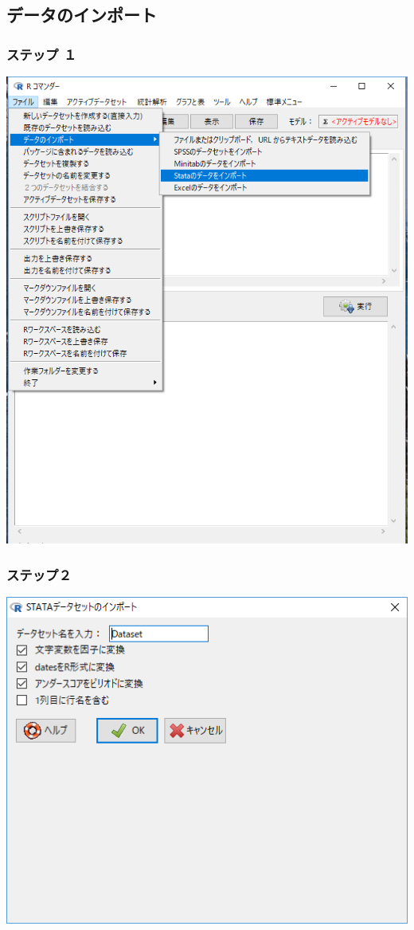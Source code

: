 \documentclass[11pt,]{problemset}
\begin{document}
\subsection{データのインポート}

\subsubsection{ステップ １}

\begin{center}\includegraphics[width=0.8\linewidth]{pic/import00} \end{center}

\hypertarget{-1}{%
\subsubsection{ステップ２}\label{-1}}

\begin{center}\includegraphics[width=0.5\linewidth]{pic/import02} \end{center}
\end{document}
